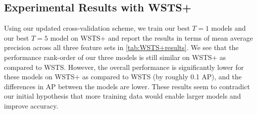 \begin{table}[h]
    \centering
    \caption{Mean test AP $\pm$ standard deviation using vegetation features only (Veg), vegetation, land cover, topography and weather (Multi) and All features, when training on the WSTS+ dataset Results style: \textbf{best} }
    \label{tab:WSTS+results}
\end{table}

\subsection{Experimental Results with WSTS+}
Using our updated cross-validation scheme, we train our best $T=1$ models and our best $T=5$ model on WSTS+ and report the results in terms of mean average precision across all three feature sets in \cref{tab:WSTS+results}.  We see that the performance rank-order of our three models is still similar on WSTS+ as compared to WSTS. However, the overall performance is significantly lower for these models on WSTS+ as compared to WSTS (by roughly 0.1 AP), and the differences in AP between the models are lower. These results seem to contradict our initial hypothesis that more training data would enable larger models and improve accuracy. 

